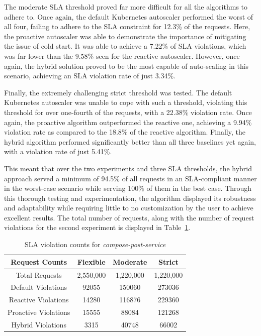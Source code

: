 The moderate SLA threshold proved far more difficult for all the algorithms to adhere to. Once again, the default Kubernetes autoscaler performed the worst of all four, failing to adhere to the SLA constraint for 12.3\% of the requests. Here, the proactive autoscaler was able to demonstrate the importance of mitigating the issue of cold start. It was able to achieve a 7.22\% of SLA violations, which was far lower than the 9.58\% seen for the reactive autoscaler. However, once again, the hybrid solution proved to be the most capable of auto-scaling in this scenario, achieving an SLA violation rate of just 3.34\%.

Finally, the extremely challenging strict threshold was tested. The default Kubernetes autoscaler was unable to cope with such a threshold, violating this threshold for over one-fourth of the requests, with a 22.38\% violation rate. Once again, the proactive algorithm outperformed the reactive one, achieving a 9.94\% violation rate as compared to the 18.8\% of the reactive algorithm. Finally, the hybrid algorithm performed significantly better than all three baselines yet again, with a violation rate of just 5.41\%.\par

This meant that over the two experiments and three SLA thresholds, the hybrid approach served a minimum of 94.5\% of all requests in an SLA-compliant manner in the worst-case scenario while serving 100\% of them in the best case. Through this thorough testing and experimentation, the algorithm displayed its robustness and adaptability while requiring little to no customization by the user to achieve excellent results. The total number of requests, along with the number of request violations for the second experiment is displayed in Table~\ref{tab:exp2-sla-violation-count}.\par

\begin{table}
    \caption{SLA violation counts for \textit{compose-post-service}}\label{tab:exp2-sla-violation-count}
    \centering
    \begin{tabular}{cccc}
        \toprule
        \textbf{Request Counts} & \textbf{Flexible} & \textbf{Moderate} & \textbf{Strict} \\
        \midrule
        Total Requests  & 2,550,000 & 1,220,000 & 1,220,000\\
        \midrule
        Default Violations & \num[group-separator={,}]{92055} & \num[group-separator={,}]{150060} & \num[group-separator={,}]{273036} \\
        Reactive Violations & \num[group-separator={,}]{14280} & \num[group-separator={,}]{116876} & \num[group-separator={,}]{229360} \\
        Proactive Violations & \num[group-separator={,}]{15555} & \num[group-separator={,}]{88084} & \num[group-separator={,}]{121268} \\
        Hybrid Violations & \num[group-separator={,}]{3315} & \num[group-separator={,}]{40748} & \num[group-separator={,}]{66002} \\
        \toprule
    \end{tabular}
\end{table}

